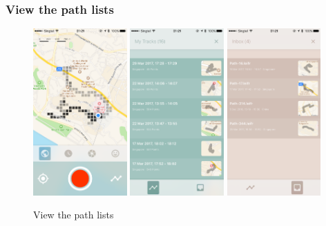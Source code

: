 \documentclass[12pt,a4paper]{article}
\begin{document}
            \subsubsection{View the path lists}
            \label{sec:view-path-list}
            \begin{figure}[H]
                \includegraphics[width=0.32\textwidth]{2-3-1-a}
                \includegraphics[width=0.32\textwidth]{2-3-1-b}
                \includegraphics[width=0.32\textwidth]{2-3-1-c}
                \centering
                \caption{View the path lists}
                \label{fig:view-path-list}
            \end{figure}
            
\end{document}

